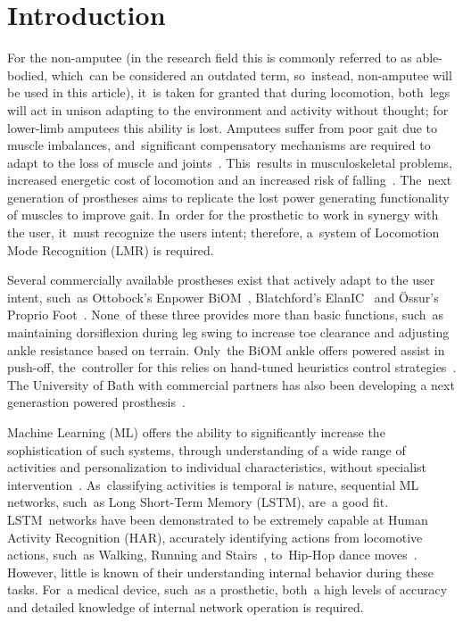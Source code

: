 \section{Introduction}
For the non-amputee %
(in the research field this is commonly referred to as able-bodied, which~can be considered an outdated term, so~instead, non-amputee will be used in this article), it~is taken for granted that during locomotion, both~legs will act in unison adapting to the environment and activity without thought; for lower-limb amputees this ability is lost. Amputees suffer from poor gait due to muscle imbalances, and~significant compensatory mechanisms are required to adapt to the loss of muscle and joints~\cite{Silverman2008}. This~results in musculoskeletal problems, increased energetic cost of locomotion and an increased risk of falling~\cite{Herr2012, Piazza2017, McDonald2018}. The~next generation of prostheses aims to replicate the lost power generating functionality of muscles to improve gait. In~order for the prosthetic to work in synergy with the user, it~must recognize the users intent; therefore, a~system of Locomotion Mode Recognition (LMR) is required.

Several commercially available prostheses exist that actively adapt to the user intent, such~as Ottobock's Enpower BiOM~\cite{Enpower}, Blatchford's ElanIC~\cite{ElanIC} and \"Ossur's Proprio Foot~\cite{Proprio}. None~of these three provides more than basic functions, such~as maintaining dorsiflexion during leg swing to increase toe clearance and adjusting ankle resistance based on terrain. Only~the BiOM ankle offers powered assist in push-off, the~controller for this relies on hand-tuned heuristics control strategies~\cite{Montgomery2018}.   {The University of Bath with commercial partners has also been developing a next generastion powered prosthesis}~\cite{Yu2019}.

Machine Learning (ML) offers the ability to significantly increase the sophistication of such systems, through understanding of a wide range of activities and personalization to individual characteristics, without specialist intervention~\cite{Labarriere2020}. As~classifying activities is temporal is nature, sequential ML networks, such~as Long Short-Term Memory (LSTM), are~a good fit. LSTM~networks have been demonstrated to be extremely capable at Human Activity Recognition (HAR), accurately identifying actions from locomotive actions, such~as Walking, Running and Stairs~\cite{Murad2017}, to~Hip-Hop dance moves~\cite{Samprita2020}. However, little is known of their understanding internal behavior during these tasks. For~a medical device, such~as a prosthetic, both~a high levels of accuracy and detailed knowledge of internal network operation is required.

